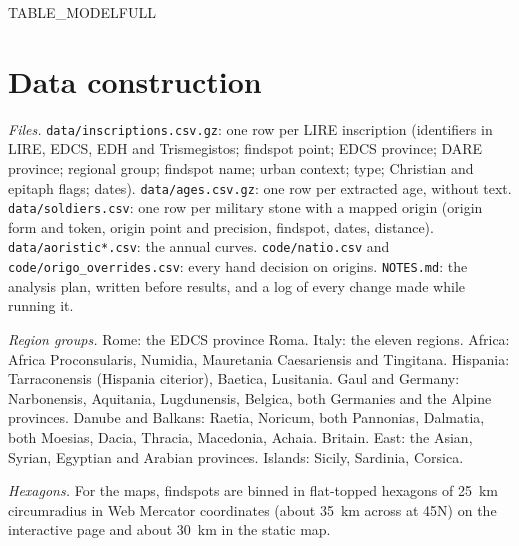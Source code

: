 {{TABLE_MODELFULL}}

\section{Data construction}
\textit{Files.} \texttt{data/inscriptions.csv.gz}: one row per LIRE inscription (identifiers in LIRE, EDCS, EDH and Trismegistos; findspot point; EDCS province; DARE province; regional group; findspot name; urban context; type; Christian and epitaph flags; dates). \texttt{data/ages.csv.gz}: one row per extracted age, without text. \texttt{data/soldiers.csv}: one row per military stone with a mapped origin (origin form and token, origin point and precision, findspot, dates, distance). \texttt{data/aoristic*.csv}: the annual curves. \texttt{code/natio.csv} and \texttt{code/origo\_overrides.csv}: every hand decision on origins. \texttt{NOTES.md}: the analysis plan, written before results, and a log of every change made while running it.

\textit{Region groups.} Rome: the EDCS province Roma. Italy: the eleven regions. Africa: Africa Proconsularis, Numidia, Mauretania Caesariensis and Tingitana. Hispania: Tarraconensis (Hispania citerior), Baetica, Lusitania. Gaul and Germany: Narbonensis, Aquitania, Lugdunensis, Belgica, both Germanies and the Alpine provinces. Danube and Balkans: Raetia, Noricum, both Pannonias, Dalmatia, both Moesias, Dacia, Thracia, Macedonia, Achaia. Britain. East: the Asian, Syrian, Egyptian and Arabian provinces. Islands: Sicily, Sardinia, Corsica.

\textit{Hexagons.} For the maps, findspots are binned in flat-topped hexagons of 25~km circumradius in Web Mercator coordinates (about 35~km across at 45\textdegree{}N) on the interactive page and about 30~km in the static map.
